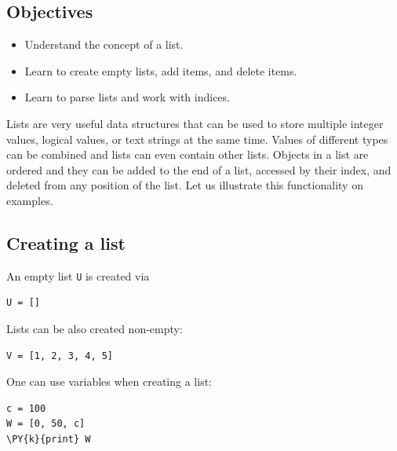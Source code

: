 \subsection[\ \ Objectives]{Objectives} 
 
\begin{itemize}
\item Understand the concept of a list.
\item Learn to create empty lists, add items, and delete items.
\item Learn to parse lists and work with indices.
\end{itemize}
Lists are very useful data structures that can be used to store multiple 
integer values, logical values, or text strings at the same time. 
Values of different types can be combined and lists can even contain other lists.
Objects in a list are ordered and they can be added to the end of a list, 
accessed by their index, and deleted from any position of the list. Let us 
illustrate this functionality on examples.

\subsection[\ \ Creating a list]{Creating a list}

\noindent
An empty list {\tt U} is created via \\

\begin{bbox}
\begin{Verbatim}[commandchars=\\\{\}]
U = []
\end{Verbatim}
\end{bbox}
\vspace{6mm}

\noindent
Lists can be also created non-empty:\\

\begin{bbox}
\begin{Verbatim}[commandchars=\\\{\}]
V = [1, 2, 3, 4, 5]
\end{Verbatim}
\end{bbox}
\vspace{6mm}

\noindent
One can use variables when creating a list:\\

\begin{bbox}
\begin{Verbatim}[commandchars=\\\{\}]
c = 100
W = [0, 50, c]
\PY{k}{print} W
\end{Verbatim}
\end{bbox}
\vspace{6mm}

